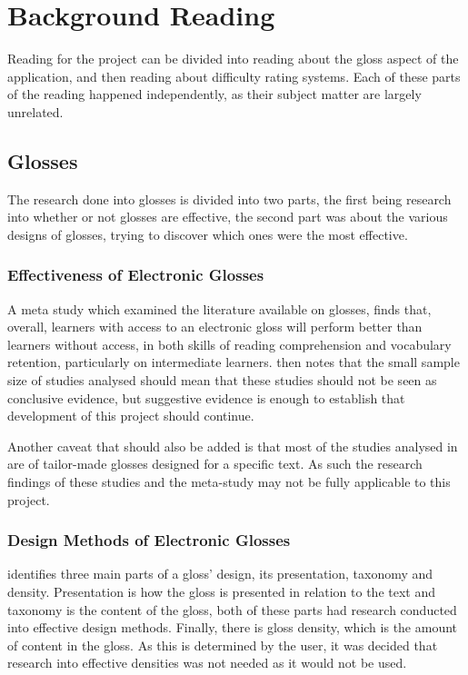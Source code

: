 \chapter{Background Reading}

Reading for the project can be divided into reading about the gloss aspect of the application, and then reading about difficulty rating systems. Each of these parts of the reading happened independently, as their subject matter are largely unrelated.


\section{Glosses}

The research done into glosses is divided into two parts, the first being research into whether or not glosses are effective, the second part was about the various designs of glosses, trying to discover which ones were the most effective.

\subsection{Effectiveness of Electronic Glosses}

A meta study \autocite{abraham2008} which examined the literature available on glosses, finds that, overall, learners with access to an electronic gloss will perform better than learners without access, in both skills of reading comprehension and vocabulary retention, particularly on intermediate learners. \textcite{abraham2008} then notes that the small sample size of studies analysed should mean that these studies should not be seen as conclusive evidence, but suggestive evidence is enough to establish that development of this project should continue.

Another caveat that should also be added is that most of the studies analysed in \textcite{abraham2008} are of tailor-made glosses designed for a specific text. As such the research findings of these studies and the meta-study may not be fully applicable to this project.


\subsection{Design Methods of Electronic Glosses}

\textcite{roby1999} identifies three main parts of a gloss' design, its presentation, taxonomy and density. Presentation is how the gloss is presented in relation to the text and taxonomy is the content of the gloss, both of these parts had research conducted into effective design methods. Finally, there is gloss density, which is the amount of content in the gloss. As this is determined by the user, it was decided that research into effective densities was not needed as it would not be used.

